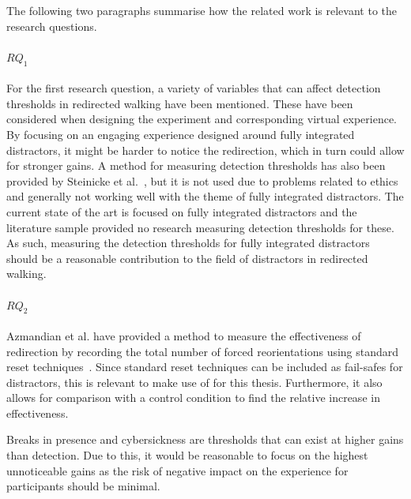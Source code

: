 The following two paragraphs summarise how the related work is relevant to the research questions.

\paragraph{$RQ_1$}
For the first research question, a variety of variables that can affect detection thresholds in redirected walking have been mentioned. These have been considered when designing the experiment and corresponding virtual experience. By focusing on an engaging experience designed around fully integrated distractors, it might be harder to notice the redirection, which in turn could allow for stronger gains. A method for measuring detection thresholds has also been provided by Steinicke et al.~\cite{5072212}, but it is not used due to problems related to ethics and generally not working well with the theme of fully integrated distractors. The current state of the art is focused on fully integrated distractors and the literature sample provided no research measuring detection thresholds for these. As such, measuring the detection thresholds for fully integrated distractors should be a reasonable contribution to the field of distractors in redirected walking.

\paragraph{$RQ_2$}
Azmandian et al. have provided a method to measure the effectiveness of redirection by recording the total number of forced reorientations using standard reset techniques~\cite{azmandian2015physical}. Since standard reset techniques can be included as fail-safes for distractors, this is relevant to make use of for this thesis. Furthermore, it also allows for comparison with a control condition to find the relative increase in effectiveness.

Breaks in presence and cybersickness are thresholds that can exist at higher gains than detection. Due to this, it would be reasonable to focus on the highest unnoticeable gains as the risk of negative impact on the experience for participants should be minimal. 

